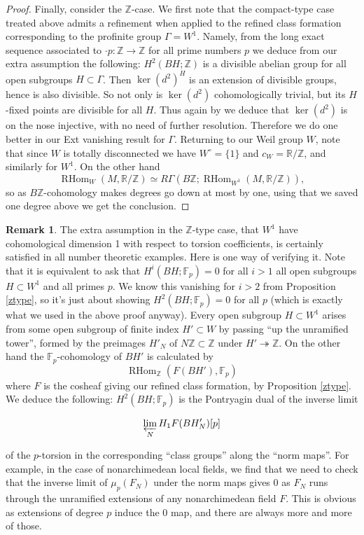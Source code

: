 \documentclass[12pt]{article}
\theoremstyle{definition}
\newtheorem{remark}[theorem]{Remark}
\newcommand{\on}{\operatorname}
\newcommand{\mbb}{\mathbb}
\begin{document}
\begin{proof}
Finally, consider the $\mbb{Z}$-case.  We first note that the compact-type case treated above admits a refinement when applied to the refined class formation corresponding to the profinite group $\Gamma=W^1$. Namely, from the long exact sequence associated to $\cdot p:\mbb{Z} \to \mbb{Z}$ for all prime numbers $p$ we deduce from our extra assumption the following: $H^2(BH;\mbb{Z})$ is a divisible abelian group for all open subgroups $H\subset \Gamma$.   Then $\on{ker}(d^2)^H$ is an extension of divisible groups, hence is also divisible. So not only is $\on{ker}(d^2)$ cohomologically trivial, but its $H$-fixed points are divisible for all $H$.  Thus again by \cite{martinez} we deduce that $\on{ker}(d^2)$ is on the nose injective, with no need of further resolution.  Therefore we do one better in our Ext vanishing result for $\Gamma$.  Returning to our Weil group $W$, note that since $W$ is totally disconnected we have $W^\circ=\{1\}$ and $c_W=\mbb{R}/\mbb{Z}$, and similarly for $W^1$.  On the other hand
$$\on{RHom}_W(M,\mbb{R}/\mbb{Z})\simeq R\Gamma(B\mbb{Z};\on{RHom}_{W^1}(M,\mbb{R}/\mbb{Z})),$$
so as $B\mbb{Z}$-cohomology makes degrees go down at most by one, using that we saved one degree above we get the conclusion.
\end{proof}

\begin{remark}
The extra assumption in the $\mbb{Z}$-type case, that $W^1$ have cohomological dimension 1 with respect to torsion coefficients, is certainly satisfied in all number theoretic examples.  Here is one way of verifying it.  Note that it is equivalent to ask that $H^i(BH;\mbb{F}_p)=0$ for all $i>1$ all open subgroups $H\subset W^1$ and all primes $p$.  We know this vanishing for $i>2$ from Proposition \ref{ztype}, so it's just about showing $H^2(BH;\mbb{F}_p)=0$ for all $p$ (which is exactly what we used in the above proof anyway).  Every open subgroup $H\subset W^1$ arises from some open subgroup of finite index $H'\subset W$ by passing ``up the unramified tower'', formed by the preimages $H'_N$ of $N\mbb{Z}\subset\mbb{Z}$ under $H' \twoheadrightarrow \mbb{Z}$.  On the other hand the $\mbb{F}_p$-cohomology of $BH'$ is calculated by
$$\on{RHom}_{\mbb{Z}}(F(BH'),\mbb{F}_p)$$
where $F$ is the cosheaf giving our refined class formation, by Proposition \ref{ztype}.  We deduce the following: $H^2(BH;\mbb{F}_p)$ is the Pontryagin dual of the inverse limit

$$\varprojlim_N H_1F(BH'_N)[p]$$

\noindent of the $p$-torsion in the corresponding ``class groups'' along the ``norm maps''.  For example, in the case of nonarchimedean local fields, we find that we need to check that the inverse limit of $\mu_p(F_N)$ under the norm maps gives $0$ as $F_N$ runs through the unramified extensions of any nonarchimedean field $F$.  This is obvious as extensions of degree $p$ induce the $0$ map, and there are always more and more of those.
\end{remark}
\end{document}
